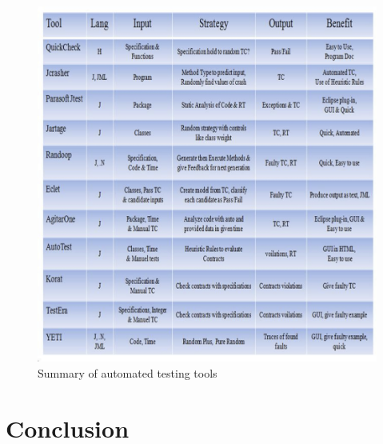 \begin{figure}[h]
	\centering
	\includegraphics[scale=0.6]{Literature/tools}
	\caption{Summary of automated testing tools}
\end{figure}


\section{Conclusion}




